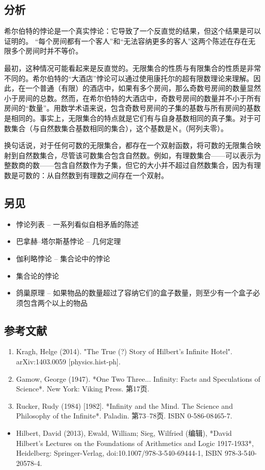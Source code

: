 \subsection{分析}  
希尔伯特的悖论是一个真实悖论：它导致了一个反直觉的结果，但这个结果是可以证明的。 “每个房间都有一个客人”和“无法容纳更多的客人”这两个陈述在存在无限多个房间时并不等价。

最初，这种情况可能看起来是反直觉的。无限集合的性质与有限集合的性质是非常不同的。希尔伯特的“大酒店”悖论可以通过使用康托尔的超有限数理论来理解。因此，在一个普通（有限）的酒店中，如果有多个房间，那么奇数号房间的数量显然小于房间的总数。然而，在希尔伯特的大酒店中，奇数号房间的数量并不小于所有房间的“数量”。用数学术语来说，包含奇数号房间的子集的基数与所有房间的基数是相同的。事实上，无限集合的特点就是它们有与自身基数相同的真子集。对于可数集合（与自然数集合基数相同的集合），这个基数是ℵ₀（阿列夫零）。

换句话说，对于任何可数的无限集合，都存在一个双射函数，将可数的无限集合映射到自然数集合，尽管该可数集合包含自然数。例如，有理数集合——可以表示为整数商的数——包含自然数作为子集，但它的大小并不超过自然数集合，因为有理数是可数的：从自然数到有理数之间存在一个双射。
\subsection{另见}  
\begin{itemize}
\item 悖论列表 – 一系列看似自相矛盾的陈述  
\item 巴拿赫–塔尔斯基悖论 – 几何定理  
\item 伽利略悖论 – 集合论中的悖论  
\item 集合论的悖论  
\item 鸽巢原理 – 如果物品的数量超过了容纳它们的盒子数量，则至少有一个盒子必须包含两个以上的物品
\end{itemize}
\subsection{参考文献}
\begin{enumerate}
\item Kragh, Helge (2014). "The True (?) Story of Hilbert's Infinite Hotel". arXiv:1403.0059 [physics.hist-ph].  
\item Gamow, George (1947). *One Two Three... Infinity: Facts and Speculations of Science*. New York: Viking Press. 第17页.  
\item Rucker, Rudy (1984) [1982]. *Infinity and the Mind. The Science and Philosophy of the Infinite*. Paladin. 第73–78页. ISBN 0-586-08465-7.  
\end{enumerate}
\begin{itemize}
\item Hilbert, David (2013), Ewald, William; Sieg, Wilfried (编辑), *David Hilbert's Lectures on the Foundations of Arithmetics and Logic 1917-1933*, Heidelberg: Springer-Verlag, doi:10.1007/978-3-540-69444-1, ISBN 978-3-540-20578-4.  
\end{itemize}